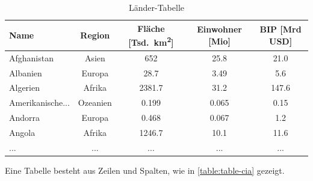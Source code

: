 \begin{table}[H]
  \centering
  \begin{tabular}{lcccc}
    \toprule
    \textbf{Name}    & \textbf{Region} & \textbf{Fläche [Tsd.\ km\textsuperscript{2}]} & \textbf{Einwohner [Mio]} & \textbf{BIP [Mrd USD]} \\
    \midrule
    Afghanistan      & Asien           & 652             & 25.8             & 21.0        \\
    Albanien         & Europa          & 28.7            & 3.49              & 5.6         \\
    Algerien         & Afrika          & 2381.7         & 31.2              & 147.6       \\
    Amerikanische... & Ozeanien        & 0.199           & 0.065 & 0.15        \\
    Andorra          & Europa          & 0.468           & 0.067 & 1.2         \\
    Angola           & Afrika          & 1246.7         & 10.1              & 11.6        \\
    \midrule
    ...              & ...             & ...             & ...                & ...          \\
    \bottomrule
  \end{tabular}
  \caption{Länder-Tabelle}
  \label{table:cia-values}
\end{table}


Eine Tabelle besteht aus Zeilen und Spalten, wie in \cref{table:table-cia} gezeigt.


